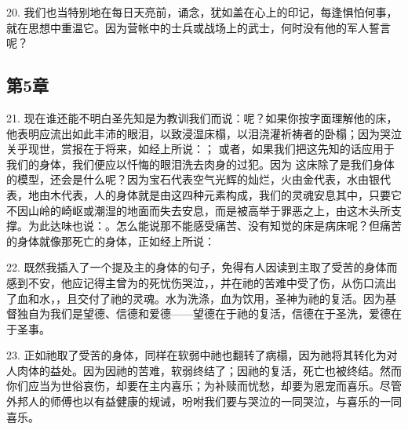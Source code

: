20. 我们也当特别地在每日天亮前，诵念，犹如盖在心上的印记，每逢惧怕何事，就在思想中重温它。因为营帐中的士兵或战场上的武士，何时没有他的军人誓言呢？\par


\subsection{第5章}

\par

21. 现在谁还能不明白圣先知是为教训我们而说：呢？如果你按字面理解他的床，他表明应流出如此丰沛的眼泪，以致浸湿床榻，以泪浇灌祈祷者的卧榻；因为哭泣关乎现世，赏报在于将来，如经上所说：； 或者，如果我们把这先知的话应用于我们的身体，我们便应以忏悔的眼泪洗去肉身的过犯。因为 这床除了是我们身体的模型，还会是什么呢？因为宝石代表空气光辉的灿烂，火由金代表，水由银代表，地由木代表，人的身体就是由这四种元素构成，我们的灵魂安息其中，只要它不因山岭的崎岖或潮湿的地面而失去安息，而是被高举于罪恶之上，由这木头所支撑。为此达味也说：。怎么能说那不能感受痛苦、没有知觉的床是病床呢？但痛苦的身体就像那死亡的身体，正如经上所说：\par

22. 既然我插入了一个提及主的身体的句子，免得有人因读到主取了受苦的身体而感到不安，他应记得主曾为的死忧伤哭泣，，并在祂的苦难中受了伤，从伤口流出了血和水，，且交付了祂的灵魂。水为洗涤，血为饮用，圣神为祂的复活。因为基督独自为我们是望德、信德和爱德——望德在于祂的复活，信德在于圣洗，爱德在于圣事。\par

23. 正如祂取了受苦的身体，同样在软弱中祂也翻转了病榻，因为祂将其转化为对人肉体的益处。因为因祂的苦难，软弱终结了；因祂的复活，死亡也被终结。然而你们应当为世俗哀伤，却要在主内喜乐；为补赎而忧愁，却要为恩宠而喜乐。尽管外邦人的师傅也以有益健康的规诫，吩咐我们要与哭泣的一同哭泣，与喜乐的一同喜乐。\par

